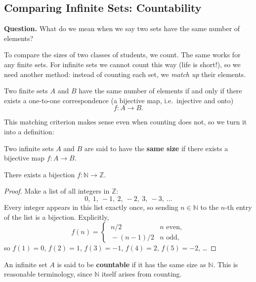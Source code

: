\documentclass[11pt]{report}
\begin{document}
\subsection{Comparing Infinite Sets: Countability}

\textbf{Question.} What do we mean when we say two sets have the same number of elements?

To compare the sizes of two classes of students, we count. The same works for any finite sets. For infinite sets we cannot count this way (life is short!), so we need another method: instead of counting each set, we \emph{match up} their elements.

\begin{thmbox}
Two finite sets $A$ and $B$ have the same number of elements if and only if there exists a one-to-one correspondence (a bijective map, i.e.\ injective and onto)
\[
f: A \to B.
\]
\end{thmbox}

This matching criterion makes sense even when counting does not, so we turn it into a definition:

\begin{defbox}
Two infinite sets $A$ and $B$ are said to have the \textbf{same size} if there exists a bijective map $f: A \to B$.
\end{defbox}

\begin{thmbox}
There exists a bijection $f: \mathbb{N} \to \mathbb{Z}$.
\end{thmbox}

\begin{proof}
Make a list of all integers in $\mathbb{Z}$:
\[
0,\ 1,\ -1,\ 2,\ -2,\ 3,\ -3,\ \ldots
\]
Every integer appears in this list exactly once, so sending $n \in \mathbb{N}$ to the $n$-th entry of the list is a bijection. Explicitly,
\[
f(n) =
\begin{cases}
\ n/2 & n \text{ even}, \\
\ -(n-1)/2 & n \text{ odd},
\end{cases}
\]
so $f(1) = 0$, $f(2) = 1$, $f(3) = -1$, $f(4) = 2$, $f(5) = -2$, \ldots
\end{proof}

\begin{defbox}[Countable]
An infinite set $A$ is said to be \textbf{countable} if it has the same size as $\mathbb{N}$. This is reasonable terminology, since $\mathbb{N}$ itself arises from counting.
\end{defbox}
\end{document}
